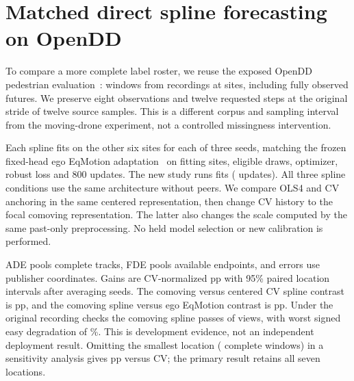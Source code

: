 \section{Matched direct spline forecasting on OpenDD}
To compare a more complete label roster, we reuse the exposed
OpenDD pedestrian evaluation~\cite{opendd}: \OpenSplineRows{} windows
from \OpenSplineRecordings{} recordings at \OpenSplineSites{} sites,
including \OpenSplineComplete{} fully observed futures. We preserve
eight observations and twelve requested steps at the original stride
of twelve source samples. This is a different corpus and sampling
interval from the moving-drone experiment, not a controlled
missingness intervention.

Each spline fits on the other six sites for each of three seeds,
matching the frozen fixed-head ego EqMotion adaptation~\cite{eqmotion}
on fitting sites, eligible draws, optimizer, robust loss and 800
updates. The new study runs \OpenSplineFits{} fits
(\OpenSplineUpdates{} updates). All three spline conditions use the
same architecture without peers. We compare OLS4 and CV anchoring in
the same centered representation, then change CV history to the
focal comoving representation. The latter also changes the scale
computed by the same past-only preprocessing. No held model selection
or new calibration is performed.

\begin{center}
\small
{}
\end{center}

ADE pools complete tracks, FDE pools available endpoints, and errors
use publisher coordinates. Gains are CV-normalized pp with 95\%
paired location intervals after averaging seeds. The comoving versus
centered CV spline contrast is \OpenSplineMovingCentered{} pp, and
the comoving spline versus ego EqMotion contrast is \OpenSplineMovingEq{}
pp. Under the original recording checks the comoving spline passes
\OpenSplineRiskPasses{} of \OpenSplineRiskViews{} views, with worst
signed easy degradation of \OpenSplineWorstEasy\%.
This is development evidence, not an independent deployment result.
Omitting the smallest location (\OpenSplineSmallComplete{} complete
windows) in a sensitivity analysis gives \OpenSplineLeaveSmallest{}
pp versus CV; the primary result retains all seven locations.

